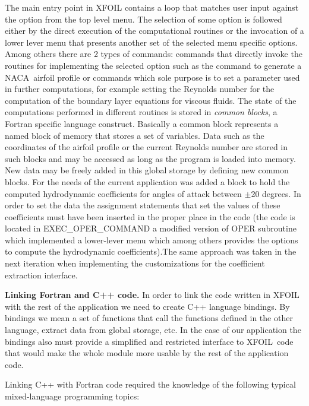 The main entry point in XFOIL contains a loop that matches user input
against the option from the top level menu. The selection of some option is
followed either by the direct execution of the computational routines or the
invocation of a lower lever menu that presents another set of the selected
menu specific options. Among others there are 2 types of commands: commands
that directly invoke the routines for implementing the selected option such
as the command to generate a NACA\ airfoil profile or commands which sole
purpose is to set a parameter used in further computations, for example
setting the Reynolds number for the computation of the boundary layer
equations for viscous fluids. The state of the computations performed in
different routines is stored in \textit{common blocks}, a Fortran specific
language construct. Basically a common block represents a named block of
memory that stores a set of variables. Data such as the coordinates of the
airfoil profile or the current Reynolds number are stored in such blocks and
may be accessed as long as the program is loaded into memory. New data may
be freely added in this global storage by defining new common blocks. For
the needs of the current application was added a block to hold the computed
hydrodynamic coefficients for angles of attack between $\pm $20 degrees. In
order to set the data the assignment statements that set the values of these
coefficients must have been inserted in the proper place in the code (the
code is located in EXEC\_OPER\_COMMAND a modified version of OPER subroutine
which implemented a lower-lever menu which among others provides the options
to compute the hydrodynamic coefficients).The same approach was taken in the
next iteration when implementing the customizations for the coefficient
extraction interface.

{\bf Linking Fortran and C++ code.} In order to link the code written in XFOIL with the rest of the application
we need to create C++ language bindings. By bindings we mean a set of
functions that call the functions defined in the other language, extract
data from global storage, etc. In the case of our application the bindings
also must provide a simplified and restricted interface to XFOIL\ code that
would make the whole module more usable by the rest of the application code.

Linking C++ with Fortran code required the knowledge of the following
typical mixed-language programming topics:

